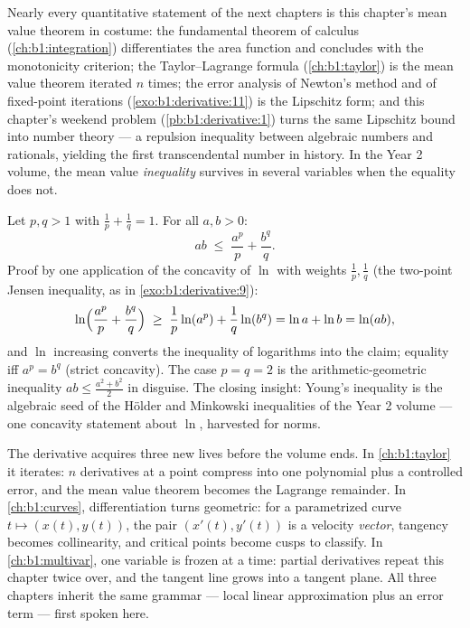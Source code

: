 \begin{remark}
Nearly every quantitative statement of the next chapters is this
chapter's mean value theorem in costume: the fundamental theorem
of calculus (\cref{ch:b1:integration}) differentiates the area
function and concludes with the monotonicity criterion; the
Taylor--Lagrange formula (\cref{ch:b1:taylor}) is the mean value
theorem iterated $n$ times; the error analysis of Newton's method
and of fixed-point iterations (\cref{exo:b1:derivative:11}) is
the Lipschitz form; and this chapter's weekend problem
(\cref{pb:b1:derivative:1}) turns the same Lipschitz bound into
number theory --- a repulsion inequality between algebraic
numbers and rationals, yielding the first transcendental number
in history. In the Year 2 volume, the mean value
\emph{inequality} survives in several variables when the equality
does not.
\end{remark}

\begin{example}\label{ex:b1:derivative:young}
Let $p, q > 1$ with $\frac1p + \frac1q = 1$. For all $a, b > 0$:
\[
ab \;\leq\; \frac{a^p}{p} + \frac{b^q}{q} .
\]
Proof by one application of the concavity of $\ln$ with weights
$\frac1p, \frac1q$ (the two-point Jensen inequality, as in
\cref{exo:b1:derivative:9}):
\[
\ln\Bigl(\frac{a^p}{p} + \frac{b^q}{q}\Bigr)
\;\geq\; \frac1p \ln(a^p) + \frac1q \ln(b^q)
= \ln a + \ln b = \ln(ab),
\]
and $\ln$ increasing converts the inequality of logarithms into
the claim; equality iff $a^p = b^q$ (strict concavity). The case
$p = q = 2$ is the arithmetic-geometric inequality $ab \leq
\frac{a^2 + b^2}{2}$ in disguise. The closing insight: Young's
inequality is the algebraic seed of the H\"older and Minkowski
inequalities of the Year 2 volume --- one concavity statement
about $\ln$, harvested for norms.
\end{example}

\begin{remark}
The derivative acquires three new lives before the volume ends.
In \cref{ch:b1:taylor} it iterates: $n$ derivatives at a point
compress into one polynomial plus a controlled error, and the
mean value theorem becomes the Lagrange remainder. In
\cref{ch:b1:curves}, differentiation turns geometric: for a
parametrized curve $t \mapsto (x(t), y(t))$, the pair $(x'(t),
y'(t))$ is a velocity \emph{vector}, tangency becomes
collinearity, and critical points become cusps to classify. In
\cref{ch:b1:multivar}, one variable is frozen at a time: partial
derivatives repeat this chapter twice over, and the tangent line
grows into a tangent plane. All three chapters inherit the same
grammar --- local linear approximation plus an error term ---
first spoken here.
\end{remark}

